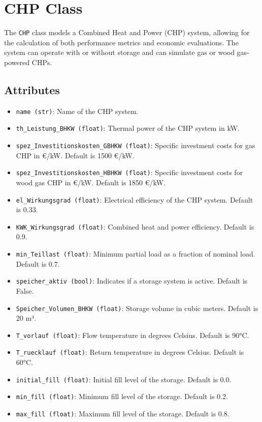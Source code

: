 \section{CHP Class}
The \texttt{CHP} class models a Combined Heat and Power (CHP) system, allowing for the calculation of both performance metrics and economic evaluations. The system can operate with or without storage and can simulate gas or wood gas-powered CHPs.

\subsection{Attributes}
\begin{itemize}
    \item \texttt{name (str)}: Name of the CHP system.
    \item \texttt{th\_Leistung\_BHKW (float)}: Thermal power of the CHP system in kW.
    \item \texttt{spez\_Investitionskosten\_GBHKW (float)}: Specific investment costs for gas CHP in €/kW. Default is 1500 €/kW.
    \item \texttt{spez\_Investitionskosten\_HBHKW (float)}: Specific investment costs for wood gas CHP in €/kW. Default is 1850 €/kW.
    \item \texttt{el\_Wirkungsgrad (float)}: Electrical efficiency of the CHP system. Default is 0.33.
    \item \texttt{KWK\_Wirkungsgrad (float)}: Combined heat and power efficiency. Default is 0.9.
    \item \texttt{min\_Teillast (float)}: Minimum partial load as a fraction of nominal load. Default is 0.7.
    \item \texttt{speicher\_aktiv (bool)}: Indicates if a storage system is active. Default is False.
    \item \texttt{Speicher\_Volumen\_BHKW (float)}: Storage volume in cubic meters. Default is 20 m³.
    \item \texttt{T\_vorlauf (float)}: Flow temperature in degrees Celsius. Default is 90°C.
    \item \texttt{T\_ruecklauf (float)}: Return temperature in degrees Celsius. Default is 60°C.
    \item \texttt{initial\_fill (float)}: Initial fill level of the storage. Default is 0.0.
    \item \texttt{min\_fill (float)}: Minimum fill level of the storage. Default is 0.2.
    \item \texttt{max\_fill (float)}: Maximum fill level of the storage. Default is 0.8.

\end{itemize}
